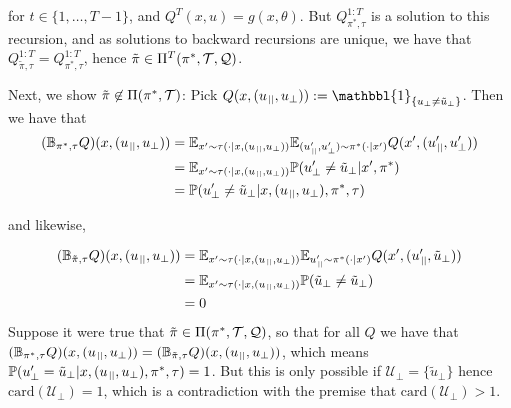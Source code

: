 %
for $t\in\{1,\dots,T-1\}$, and $Q^{T}(x,u)=g(x,\theta)$.
%
But $Q_{\pi^{*},\tau}^{1:T}$ is a solution to this recursion, and as solutions to backward recursions are unique, we have that $Q_{\tilde{\pi},\tau}^{1:T}=Q_{\pi^{*},\tau}^{1:T}$,
hence $\tilde{\pi}\in\Pi^{T}(\pi^{*},\mathcal{T},\mathcal{Q})$.

Next, we show $\tilde{\pi}\not\in\Pi(\pi^{*},\mathcal{T})$:
%
Pick $Q(x,(u_{\para},u_{\bot})):=\mathbbl{1}_{\{u_{\bot}\neq\tilde{u}_{\bot}\}}$. Then we have that
%
\begin{align}
(\mathbb{B}_{\pi^{*},\tau}Q)
(x,(u_{\para},u_{\bot}))
&
=
\mathbb{E}_{x'\sim\tau(\cdot|x,(u_{\para},u_{\bot}))}
\mathbb{E}_{(u_{\para}',u_{\bot}')\sim\pi^{*}(\cdot|x')}
Q(x',(u_{\para}',u_{\bot}'))
\\
&
=
\mathbb{E}_{x'\sim\tau(\cdot|x,(u_{\para},u_{\bot}))}
\mathbb{P}(u_{\bot}'\neq\tilde{u}_{\bot}|x',\pi^{*})
\\
&
=
\mathbb{P}(u_{\bot}'\neq\tilde{u}_{\bot}|x,(u_{\para},u_{\bot}),\pi^{*},\tau)
\end{align}

\vspace{-1.5em}
and likewise,
\vspace{-0.75em}

\begin{align}
(\mathbb{B}_{\tilde{\pi},\tau}Q)
(x,(u_{\para},u_{\bot}))
&
=
\mathbb{E}_{x'\sim\tau(\cdot|x,(u_{\para},u_{\bot}))}
\mathbb{E}_{u_{\para}'\sim\pi^{*}(\cdot|x')}
Q(x',(u_{\para}',\tilde{u}_{\bot}))
\\
&
=
\mathbb{E}_{x'\sim\tau(\cdot|x,(u_{\para},u_{\bot}))}
\mathbb{P}(\tilde{u}_{\bot}\neq\tilde{u}_{\bot})
\\
&
=
0
\end{align}
%
Suppose it were true that $\tilde{\pi}\in\Pi(\pi^{*},\mathcal{T},\mathcal{Q})$, so that for all $Q$ we have that
$
(\mathbb{B}_{\pi^{*},\tau}Q)(x,(u_{\para},u_{\bot}))
=
(\mathbb{B}_{\tilde{\pi},\tau}Q)(x,(u_{\para},u_{\bot}))
$,
which means
$
\mathbb{P}(u_{\bot}'=\tilde{u}_{\bot}|x,(u_{\para},u_{\bot}),\pi^{*},\tau)
=
1
$.
%
But this is only possible if $\mathcal{U}_{\bot}$\pix$=$\pix$\{\tilde{u}_{\bot}\}$ hence $\text{card}(\mathcal{U}_{\bot})$\pix$=$\pix$1$, which is a contradiction with the premise that $\text{card}(\mathcal{U}_{\bot})$\pix$>$\pix$1$.
%
\QED